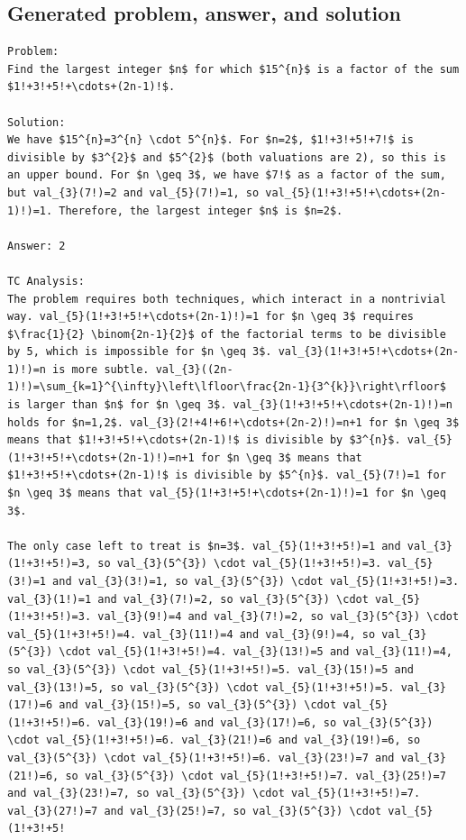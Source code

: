 \documentclass[11pt]{article}
\begin{document}
\subsection*{Generated problem, answer, and solution}
\begin{Verbatim}[breaklines=true,breakanywhere=true,fontsize=\small]
Problem:
Find the largest integer $n$ for which $15^{n}$ is a factor of the sum $1!+3!+5!+\cdots+(2n-1)!$.

Solution:
We have $15^{n}=3^{n} \cdot 5^{n}$. For $n=2$, $1!+3!+5!+7!$ is divisible by $3^{2}$ and $5^{2}$ (both valuations are 2), so this is an upper bound. For $n \geq 3$, we have $7!$ as a factor of the sum, but val_{3}(7!)=2 and val_{5}(7!)=1, so val_{5}(1!+3!+5!+\cdots+(2n-1)!)=1. Therefore, the largest integer $n$ is $n=2$.

Answer: 2

TC Analysis:
The problem requires both techniques, which interact in a nontrivial way. val_{5}(1!+3!+5!+\cdots+(2n-1)!)=1 for $n \geq 3$ requires $\frac{1}{2} \binom{2n-1}{2}$ of the factorial terms to be divisible by 5, which is impossible for $n \geq 3$. val_{3}(1!+3!+5!+\cdots+(2n-1)!)=n is more subtle. val_{3}((2n-1)!)=\sum_{k=1}^{\infty}\left\lfloor\frac{2n-1}{3^{k}}\right\rfloor$ is larger than $n$ for $n \geq 3$. val_{3}(1!+3!+5!+\cdots+(2n-1)!)=n holds for $n=1,2$. val_{3}(2!+4!+6!+\cdots+(2n-2)!)=n+1 for $n \geq 3$ means that $1!+3!+5!+\cdots+(2n-1)!$ is divisible by $3^{n}$. val_{5}(1!+3!+5!+\cdots+(2n-1)!)=n+1 for $n \geq 3$ means that $1!+3!+5!+\cdots+(2n-1)!$ is divisible by $5^{n}$. val_{5}(7!)=1 for $n \geq 3$ means that val_{5}(1!+3!+5!+\cdots+(2n-1)!)=1 for $n \geq 3$.

The only case left to treat is $n=3$. val_{5}(1!+3!+5!)=1 and val_{3}(1!+3!+5!)=3, so val_{3}(5^{3}) \cdot val_{5}(1!+3!+5!)=3. val_{5}(3!)=1 and val_{3}(3!)=1, so val_{3}(5^{3}) \cdot val_{5}(1!+3!+5!)=3. val_{3}(1!)=1 and val_{3}(7!)=2, so val_{3}(5^{3}) \cdot val_{5}(1!+3!+5!)=3. val_{3}(9!)=4 and val_{3}(7!)=2, so val_{3}(5^{3}) \cdot val_{5}(1!+3!+5!)=4. val_{3}(11!)=4 and val_{3}(9!)=4, so val_{3}(5^{3}) \cdot val_{5}(1!+3!+5!)=4. val_{3}(13!)=5 and val_{3}(11!)=4, so val_{3}(5^{3}) \cdot val_{5}(1!+3!+5!)=5. val_{3}(15!)=5 and val_{3}(13!)=5, so val_{3}(5^{3}) \cdot val_{5}(1!+3!+5!)=5. val_{3}(17!)=6 and val_{3}(15!)=5, so val_{3}(5^{3}) \cdot val_{5}(1!+3!+5!)=6. val_{3}(19!)=6 and val_{3}(17!)=6, so val_{3}(5^{3}) \cdot val_{5}(1!+3!+5!)=6. val_{3}(21!)=6 and val_{3}(19!)=6, so val_{3}(5^{3}) \cdot val_{5}(1!+3!+5!)=6. val_{3}(23!)=7 and val_{3}(21!)=6, so val_{3}(5^{3}) \cdot val_{5}(1!+3!+5!)=7. val_{3}(25!)=7 and val_{3}(23!)=7, so val_{3}(5^{3}) \cdot val_{5}(1!+3!+5!)=7. val_{3}(27!)=7 and val_{3}(25!)=7, so val_{3}(5^{3}) \cdot val_{5}(1!+3!+5!
\end{Verbatim}
\clearpage
\end{document}
